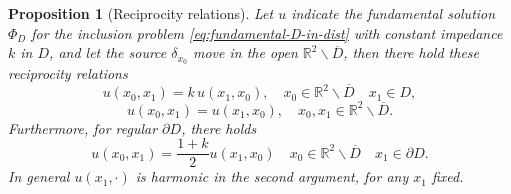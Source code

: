 \documentclass[10pt, a4paper, twoside, openright]{book}
\theoremstyle{definition}
\theoremstyle{plain}
\theoremstyle{plain}
\theoremstyle{plain}
\newtheorem{proposition}[subsection]{Proposition}
\theoremstyle{plain}
\theoremstyle{plain}
\theoremstyle{plain}
\theoremstyle{plain}
\theoremstyle{plain}
\begin{document}
\begin{proposition}[Reciprocity relations]
 \label{prop:reciprocity}
 Let $u$ indicate the fundamental solution $\Phi_D$ for the inclusion problem \eqref{eq:fundamental-D-in-dist} with constant impedance $k$ in $D$, and let the source $\delta_{x_0}$ move in the open $\mathbb{R}^2\backslash\overline{D}$, then there hold these reciprocity relations
 \begin{equation}
  u(x_0,x_1) = k\, u(x_1,x_0),\quad x_0\in \mathbb{R}^2\backslash\overline{D} \quad x_1\in D,
 \end{equation} 
 \begin{equation}
  u(x_0,x_1) = u(x_1,x_0),\quad x_0, x_1\in \mathbb{R}^2\backslash \overline{D}.
 \end{equation}
 Furthermore, for regular $\partial D$, there holds
 \begin{equation}
 \label{eq:reciprocity-boundary}
  u(x_0,x_1) = \frac{1+k}{2}u(x_1,x_0)\quad x_0\in \mathbb{R}^2\backslash \overline{D} \quad x_1\in \partial D.
 \end{equation}
 In general $u(x_1,\cdot)$ is harmonic in the second argument, for any $x_1$ fixed.
 \end{proposition}
\end{document}
